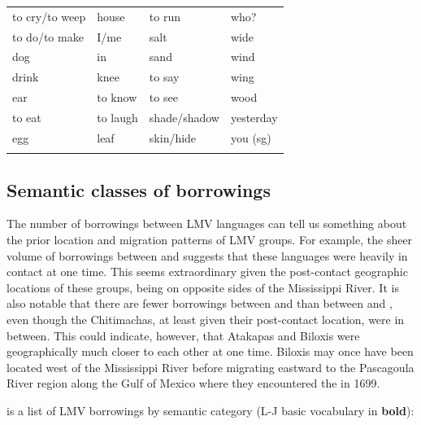 \documentclass[output=paper]{LSP/langsci}
\begin{document}
\begin{table}
\begin{tabular}{llll}
 to cry/to weep          &      house                 &         to run        &      who? \\
 to do/to make           &      I/me                  &         salt          &      wide \\
 dog                     &      in                    &         sand          &      wind \\
 drink                   &      knee                  &         to say        &      wing \\
 ear                     &      to know               &         to see        &      wood \\
 to eat                  &      to laugh              &         shade/shadow  &      yesterday\\
  egg                    &     leaf                   &          skin/hide    &     you (sg) \\
       \lspbottomrule
\end{tabular}                                                                 
\end{table}

\subsection{Semantic classes of borrowings}
	
	The number of borrowings between LMV languages can tell us something about the prior location and migration patterns of LMV groups. For example, the sheer volume of borrowings between  and  suggests that these languages were heavily in contact at one time. This seems extraordinary given the post-contact geographic locations of these groups, being on opposite sides of the Mississippi River. It is also notable that there are fewer borrowings between  and  than between  and , even though the Chitimachas, at least given their post-contact location, were in between. This could indicate, however, that Atakapas and Biloxis were geographically much closer to each other at one time. Biloxis may once have been located west of the Mississippi River before migrating eastward to the Pascagoula River region along the Gulf of Mexico where they encountered the  in 1699.

 is a list of LMV borrowings by semantic category (L-J basic vocabulary in \textbf{bold}): 
\end{document}
